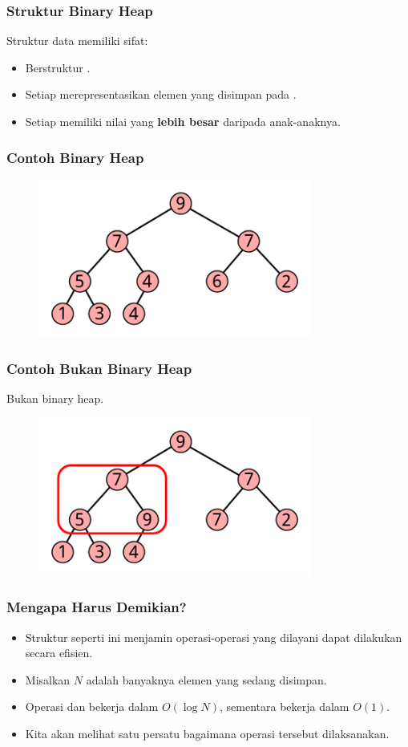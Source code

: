 \begin{frame}
\frametitle{Struktur Binary Heap}
Struktur data \pbinaryHeap memiliki sifat:
\begin{itemize}
  \item Berstruktur .
  \item Setiap \fnode merepresentasikan elemen yang disimpan pada \pheap.
  \item Setiap \fnode memiliki nilai yang \textbf{lebih besar} daripada \fnode anak-anaknya.
\end{itemize}
\end{frame}

\begin{frame}
\frametitle{Contoh Binary Heap}
\begin{figure}
  \includegraphics[width=9cm]{asset/heap.pdf}
\end{figure}
\end{frame}

\begin{frame}
\frametitle{Contoh Bukan Binary Heap}
Bukan binary heap.
\begin{figure}
  \includegraphics[width=9cm]{asset/not-heap.pdf}
\end{figure}
\end{frame}

\begin{frame}
\frametitle{Mengapa Harus Demikian?}
\begin{itemize}
  \item Struktur seperti ini menjamin operasi-operasi yang dilayani \pheap dapat dilakukan secara efisien.
  \item Misalkan $N$ adalah banyaknya elemen yang sedang disimpan.
  \item Operasi  dan  bekerja dalam $O(\log{N})$, sementara  bekerja dalam $O(1)$.
  \item Kita akan melihat satu persatu bagaimana operasi tersebut dilaksanakan.
\end{itemize}
\end{frame}


